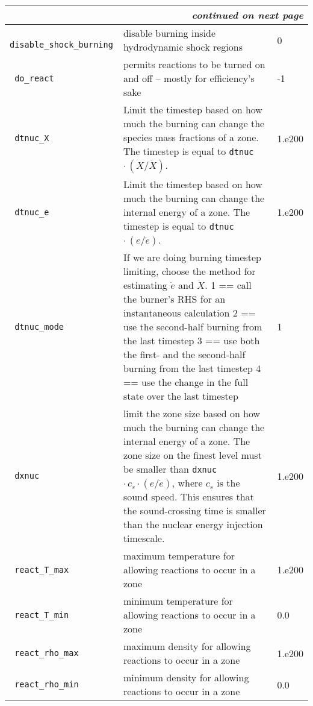 \begin{landscape}
{\begin{center}
\begin{longtable}{|l|p{5.25in}|l|}
\multicolumn{3}{|r|}{{\em continued on next page}} \\ \hline
\endfoot

\hline 
\endlastfoot


\rowcolor{tableShade}
\verb= disable_shock_burning = &  disable burning inside hydrodynamic shock regions & 0 \\
\verb= do_react = &  permits reactions to be turned on and off -- mostly for efficiency's sake & -1 \\
\rowcolor{tableShade}
\verb= dtnuc_X = &  Limit the timestep based on how much the burning can change the species mass fractions of a zone. The timestep is equal to {\tt dtnuc}  $\cdot\,(X / \dot{X})$. & 1.e200 \\
\verb= dtnuc_e = &  Limit the timestep based on how much the burning can change the internal energy of a zone. The timestep is equal to {\tt dtnuc}  $\cdot\,(e / \dot{e})$. & 1.e200 \\
\rowcolor{tableShade}
\verb= dtnuc_mode = &  If we are doing burning timestep limiting, choose the method for estimating $\dot{e}$ and $\dot{X}$. 1 == call the burner's RHS for an instantaneous calculation 2 == use the second-half burning from the last timestep 3 == use both the first- and the second-half burning from the last timestep 4 == use the change in the full state over the last timestep & 1 \\
\verb= dxnuc = &  limit the zone size based on how much the burning can change the internal energy of a zone. The zone size on the finest level must be smaller than {\tt dxnuc} $\cdot\, c_s\cdot (e / \dot{e})$, where $c_s$ is the sound speed. This ensures that the sound-crossing time is smaller than the nuclear energy injection timescale. & 1.e200 \\
\rowcolor{tableShade}
\verb= react_T_max = &  maximum temperature for allowing reactions to occur in a zone & 1.e200 \\
\verb= react_T_min = &  minimum temperature for allowing reactions to occur in a zone & 0.0 \\
\rowcolor{tableShade}
\verb= react_rho_max = &  maximum density for allowing reactions to occur in a zone & 1.e200 \\
\verb= react_rho_min = &  minimum density for allowing reactions to occur in a zone & 0.0 \\


\end{longtable}
\end{center}

}
\end{landscape}
